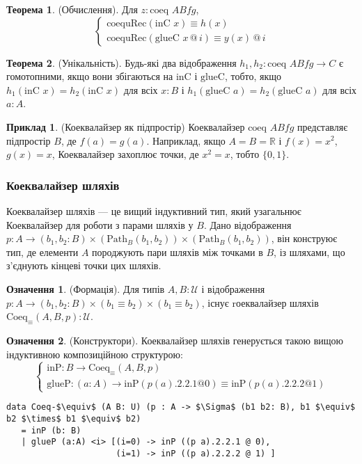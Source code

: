 \documentclass{article}
\theoremstyle{definition}
\newtheorem{theorem}{Теорема}
\newtheorem{definition}{Означення}
\newtheorem{example}{Приклад}
\begin{document}
\begin{theorem} (Обчислення).
Для \( z : \text{coeq } A B f g \),
\[
\begin{cases}
\text{coequRec}(\text{inC } x) \equiv h(x) \\
\text{coequRec}(\text{glueC } x \, @ \, i) \equiv y(x) \, @ \, i
\end{cases}
\]
\end{theorem}

\begin{theorem} (Унікальність).
Будь-які два відображення \( h_1, h_2 : \text{coeq } A B f g \to C \) є гомотопними,
якщо вони збігаються на \( \text{inC} \) і \( \text{glueC} \), тобто,
якщо \( h_1(\text{inC } x) = h_2(\text{inC } x) \) для
всіх \( x : B \) і \( h_1(\text{glueC } a) = h_2(\text{glueC } a) \) для всіх \( a : A \).
\end{theorem}

\begin{example} (Коеквалайзер як підпростір)
Коеквалайзер \( \text{coeq } A B f g \) представляє підпростір
\( B \), де \( f(a) = g(a) \). Наприклад, якщо \( A = B = \mathbb{R} \)
і \( f(x) = x^2 \), \( g(x) = x \), Коеквалайзер захоплює точки,
де \( x^2 = x \), тобто \( \{0, 1\} \).
\end{example}

\newpage
\subsubsection*{Коеквалайзер шляхів}
Коеквалайзер шляхів — це вищий індуктивний тип, який узагальнює
Коеквалайзер для роботи з парами шляхів у \( B \). Дано
відображення \( p : A \to (b_1, b_2 : B) \times (\text{Path}_B (b_1, b_2)) \times (\text{Path}_B (b_1, b_2)) \),
він конструює тип, де елементи \( A \) породжують пари
шляхів між точками в \( B \), із шляхами, що з’єднують
кінцеві точки цих шляхів.

\begin{definition} (Формація).
Для типів \( A, B : \mathcal{U} \) і відображення \( p : A \to (b_1, b_2 : B) \times (b_1 \equiv b_2) \times (b_1 \equiv b_2) \),
існує rоеквалайзер шляхів \( \text{Coeq}_\equiv(A,B,p) : \mathcal{U} \).
\end{definition}

\begin{definition} (Конструктори).
Коеквалайзер шляхів генерується такою вищою індуктивною композиційною структурою:
\[
\begin{cases}
\text{inP} : B \to \text{Coeq}_\equiv(A,B,p) \\
\text{glueP} : (a : A) \to \text{inP}(p(a).2.2.1 @ 0) \equiv \text{inP}(p(a).2.2.2 @ 1)
\end{cases}
\]
\begin{lstlisting}[mathescape=true]
data Coeq-$\equiv$ (A B: U) (p : A -> $\Sigma$ (b1 b2: B), b1 $\equiv$ b2 $\times$ b1 $\equiv$ b2)
   = inP (b: B)
   | glueP (a:A) <i> [(i=0) -> inP ((p a).2.2.1 @ 0),
                      (i=1) -> inP ((p a).2.2.2 @ 1) ]
\end{lstlisting}
\end{definition}
\end{document}
